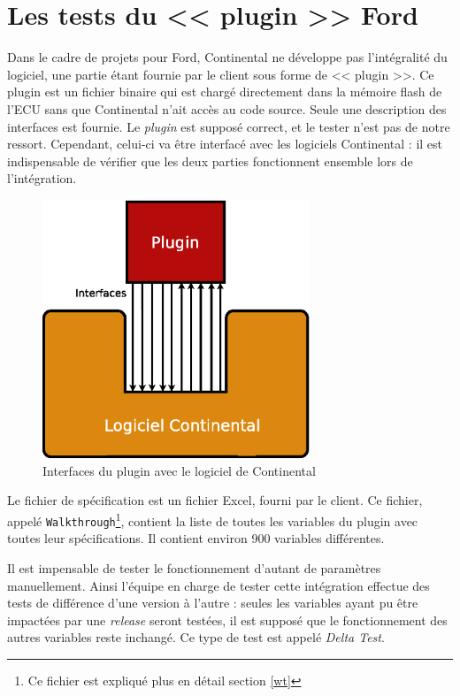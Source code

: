 	\section{Les tests du << plugin >> Ford}\label{plugin}
	Dans le cadre de projets pour Ford, Continental ne développe pas l'intégralité du logiciel, une partie étant fournie par le client sous forme de << plugin >>. Ce plugin est un fichier binaire qui est chargé directement dans la mémoire flash de l'ECU sans que Continental n'ait accès au code source. Seule une description des interfaces est fournie. Le \textit{plugin} est supposé correct, et le tester n'est pas de notre ressort. Cependant, celui-ci va être interfacé avec les logiciels Continental : il est indispensable de vérifier que les deux parties fonctionnent ensemble lors de l'intégration.
	\begin{figure}[H]
		\centering
		\includegraphics[width=8.0cm]{contents/images/plugin.eps}
		\caption{Interfaces du plugin avec le logiciel de Continental}
		\label{fig:plugin}	
	\end{figure}
	
	Le fichier de spécification est un fichier Excel, fourni par le client. Ce fichier, appelé \texttt{Walkthrough}\footnote{Ce fichier est expliqué plus en détail section \ref{wt}}, 
	contient la liste de toutes les variables du plugin avec toutes leur spécifications. Il contient
	environ 900 variables différentes. 
	
	Il est impensable de tester le fonctionnement d'autant de paramètres manuellement. Ainsi l'équipe en
	charge de tester cette intégration effectue des tests de différence d'une version à l'autre : seules les variables ayant pu être impactées par une \textit{release} seront testées, il est supposé que le fonctionnement des autres variables reste inchangé. Ce type de test est appelé \textit{Delta Test}.
	

